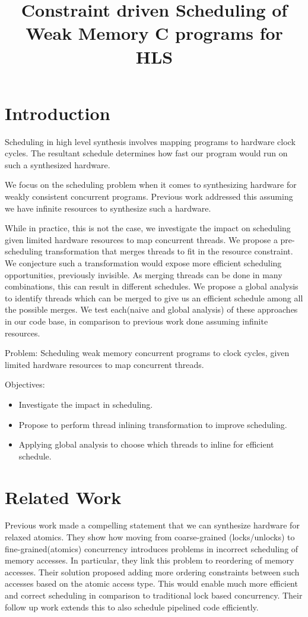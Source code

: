 \documentclass[sigplan,10pt,review]{acmart}
\title{Constraint driven Scheduling of Weak Memory C programs for HLS}
\begin{document}
    \section{Introduction}

        Scheduling in high level synthesis involves mapping programs to hardware clock cycles. 
        The resultant schedule determines how fast our program would run on such a synthesized hardware. 
        
        We focus on the scheduling problem when it comes to synthesizing hardware for weakly consistent concurrent programs.
        Previous work addressed this assuming we have infinite resources to synthesize such a hardware. 

        While in practice, this is not the case, we investigate the impact on scheduling given limited hardware resources to map concurrent threads. 
        We propose a pre-scheduling transformation that merges threads to fit in the resource constraint.
        We conjecture such a transformation would expose more efficient scheduling opportunities, previously invisible.
        As merging threads can be done in many combinations, this can result in different schedules.  
        We propose a global analysis to identify threads which can be merged to give us an efficient schedule among all the possible merges. 
        We test each(naive and global analysis) of these approaches in our code base, in comparison to previous work done assuming infinite resources. 

        Problem: Scheduling weak memory concurrent programs to clock cycles, given limited hardware resources to map concurrent threads.

        Objectives:
        \begin{itemize}
            \item Investigate the impact in scheduling.
            \item Propose to perform thread inlining transformation to improve scheduling.
            \item Applying global analysis to choose which threads to inline for efficient schedule.
        \end{itemize}


    \section{Related Work}

        Previous work made a compelling statement that we can synthesize hardware for relaxed atomics.
        They show how moving from coarse-grained (locks/unlocks) to fine-grained(atomics) concurrency introduces problems in incorrect scheduling of memory accesses.
        In particular, they link this problem to reordering of memory accesses.
        Their solution proposed adding more ordering constraints between such accesses based on the atomic access type. 
        This would enable much more efficient and correct scheduling in comparison to traditional lock based concurrency. 
        Their follow up work extends this to also schedule pipelined code efficiently.
        
\end{document}
